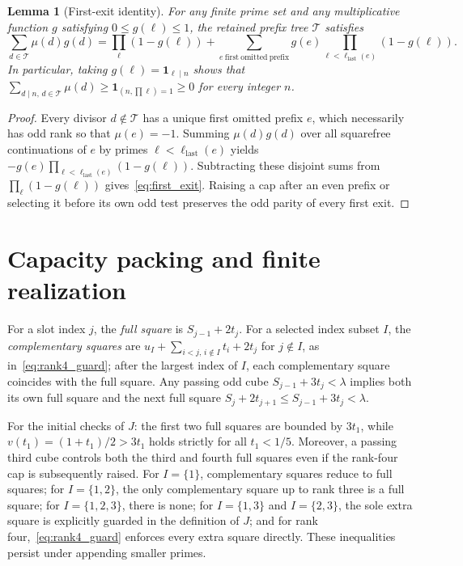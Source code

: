 \documentclass[11pt,reqno]{amsart}
\newtheorem{lemma}[theorem]{Lemma}
\theoremstyle{remark}
\newcommand{\ind}{\mathbf{1}}
\newcommand{\cT}{\mathcal{T}}
\numberwithin{equation}{section}
\begin{document}
\begin{lemma}[First-exit identity]\label{lem:first_exit}
For any finite prime set and any multiplicative function $g$ satisfying $0 \le g(\ell) \le 1$, the retained prefix tree $\cT$ satisfies
\begin{equation}\label{eq:first_exit}
\sum_{d \in \cT}\mu(d)g(d)
= \prod_\ell (1 - g(\ell))
+ \sum_{e\ \mathrm{first\ omitted\ prefix}} g(e)\prod_{\ell < \ell_{\mathrm{last}}(e)}(1 - g(\ell)).
\end{equation}
In particular, taking $g(\ell) = \ind_{\ell \mid n}$ shows that $\sum_{d \mid n,\, d \in \cT}\mu(d) \ge \ind_{(n,\prod\ell)=1} \ge 0$ for every integer $n$.
\end{lemma}

\begin{proof}
Every divisor $d \notin \cT$ has a unique first omitted prefix $e$, which necessarily has odd rank so that $\mu(e) = -1$. Summing $\mu(d)g(d)$ over all squarefree continuations of $e$ by primes $\ell < \ell_{\mathrm{last}}(e)$ yields $-g(e)\prod_{\ell < \ell_{\mathrm{last}}(e)}(1-g(\ell))$. Subtracting these disjoint sums from $\prod_\ell(1-g(\ell))$ gives~\eqref{eq:first_exit}. Raising a cap after an even prefix or selecting it before its own odd test preserves the odd parity of every first exit.
\end{proof}

\section{Capacity packing and finite realization}\label{sec:packing}

For a slot index $j$, the \emph{full square} is $S_{j-1} + 2t_j$. For a selected index subset $I$, the \emph{complementary squares} are $u_I + \sum_{i<j,\, i\notin I} t_i + 2t_j$ for $j \notin I$, as in~\eqref{eq:rank4_guard}; after the largest index of $I$, each complementary square coincides with the full square. Any passing odd cube $S_{j-1} + 3t_j < \lambda$ implies both its own full square and the next full square $S_j + 2t_{j+1} \le S_{j-1} + 3t_j < \lambda$.

For the initial checks of $J$: the first two full squares are bounded by $3t_1$, while $v(t_1) = (1+t_1)/2 > 3t_1$ holds strictly for all $t_1 < 1/5$. Moreover, a passing third cube controls both the third and fourth full squares even if the rank-four cap is subsequently raised. For $I=\{1\}$, complementary squares reduce to full squares; for $I=\{1,2\}$, the only complementary square up to rank three is a full square; for $I=\{1,2,3\}$, there is none; for $I=\{1,3\}$ and $I=\{2,3\}$, the sole extra square is explicitly guarded in the definition of $J$; and for rank four,~\eqref{eq:rank4_guard} enforces every extra square directly. These inequalities persist under appending smaller primes.
\end{document}
